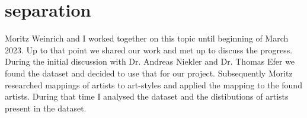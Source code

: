 \chapter{separation}
\label{cha:separation of duties}


Moritz Weinrich and I worked together on this topic until beginning of March 2023. Up to that point we shared our work and met up to discuss the progress.
During the initial discussion with Dr. Andreas Niekler and Dr. Thomas Efer we found the dataset \autocite{poloclub-diffusiondb} and decided to use that for our project.
Subsequently Moritz researched mappings of artists to art-styles and applied the mapping to the found artists. 
During that time I analysed the \autocite{poloclub-diffusiondb} dataset and the distibutions of artists present in the dataset.